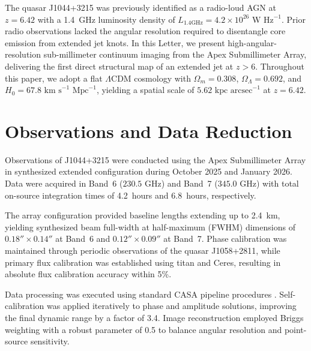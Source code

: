 \documentclass[twocolumn]{aastex631}
\begin{document}
The quasar J1044+3215 was previously identified as a radio-loud AGN at $z = 6.42$ with a 1.4~GHz luminosity density of $L_{1.4\text{GHz}} = 4.2 \times 10^{26}\text{ W Hz}^{-1}$. Prior radio observations lacked the angular resolution required to disentangle core emission from extended jet knots. In this Letter, we present high-angular-resolution sub-millimeter continuum imaging from the Apex Submillimeter Array, delivering the first direct structural map of an extended jet at $z > 6$. Throughout this paper, we adopt a flat $\Lambda$CDM cosmology with $\Omega_m = 0.308$, $\Omega_\Lambda = 0.692$, and $H_0 = 67.8\text{ km s}^{-1}\text{ Mpc}^{-1}$, yielding a spatial scale of $5.62\text{ kpc arcsec}^{-1}$ at $z = 6.42$.

\section{Observations and Data Reduction} \label{sec:obs}

Observations of J1044+3215 were conducted using the Apex Submillimeter Array in synthesized extended configuration during October 2025 and January 2026. Data were acquired in Band~6 ($230.5\text{ GHz}$) and Band~7 ($345.0\text{ GHz}$) with total on-source integration times of 4.2~hours and 6.8~hours, respectively.

The array configuration provided baseline lengths extending up to 2.4~km, yielding synthesized beam full-width at half-maximum (FWHM) dimensions of $0.18'' \times 0.14''$ at Band~6 and $0.12'' \times 0.09''$ at Band~7. Phase calibration was maintained through periodic observations of the quasar J1058+2811, while primary flux calibration was established using titan and Ceres, resulting in absolute flux calibration accuracy within 5\%.

Data processing was executed using standard CASA pipeline procedures \citep{McMullin2007}. Self-calibration was applied iteratively to phase and amplitude solutions, improving the final dynamic range by a factor of 3.4. Image reconstruction employed Briggs weighting with a robust parameter of 0.5 to balance angular resolution and point-source sensitivity.
\end{document}
